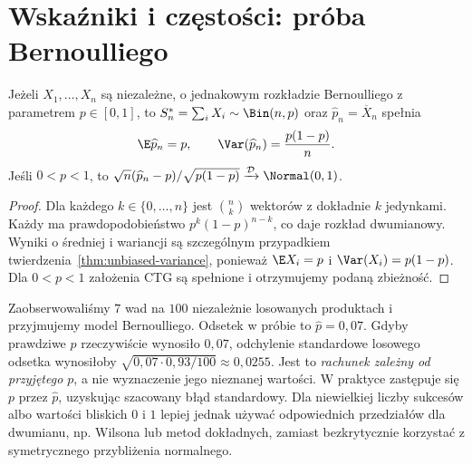 \section{Wskaźniki i częstości: próba Bernoulliego}
\begin{twierdzenie}\label{thm:prop-bin}
Jeżeli $X_1,\ldots,X_n$ są niezależne, o jednakowym rozkładzie Bernoulliego z parametrem $p\in[0,1]$, to $S_n^*=\sum_iX_i\sim\Bin(n,p)$ oraz $\widehat p_n=\overline X_n$ spełnia
\[
\E\widehat p_n=p,\qquad \Var(\widehat p_n)=\frac{p(1-p)}n.
\]
Jeśli $0<p<1$, to $\sqrt n(\widehat p_n-p)/\sqrt{p(1-p)}\xrightarrow{\mathcal D}\Normal(0,1)$.
\end{twierdzenie}
\begin{proof}
Dla każdego $k\in\{0,\ldots,n\}$ jest $\binom nk$ wektorów z dokładnie $k$ jedynkami. Każdy ma prawdopodobieństwo $p^k(1-p)^{n-k}$, co daje rozkład dwumianowy. Wyniki o średniej i wariancji są szczególnym przypadkiem twierdzenia~\ref{thm:unbiased-variance}, ponieważ $\E X_i=p$ i $\Var(X_i)=p(1-p)$. Dla $0<p<1$ założenia CTG są spełnione i otrzymujemy podaną zbieżność.
\end{proof}

\begin{przyklad}\label{ex:failure-rate}
Zaobserwowaliśmy $7$ wad na $100$ niezależnie losowanych produktach i przyjmujemy model Bernoulliego. Odsetek w próbie to $\widehat p=0{,}07$. Gdyby prawdziwe $p$ rzeczywiście wynosiło $0{,}07$, odchylenie standardowe losowego odsetka wynosiłoby $\sqrt{0{,}07\cdot0{,}93/100}\approx0{,}0255$. Jest to \emph{rachunek zależny od przyjętego $p$}, a nie wyznaczenie jego nieznanej wartości. W praktyce zastępuje się $p$ przez $\widehat p$, uzyskując szacowany błąd standardowy. Dla niewielkiej liczby sukcesów albo wartości bliskich $0$ i $1$ lepiej jednak używać odpowiednich przedziałów dla dwumianu, np. Wilsona lub metod dokładnych, zamiast bezkrytycznie korzystać z symetrycznego przybliżenia normalnego.
\end{przyklad}

